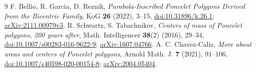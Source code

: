 \documentclass[11pt]{article}
\begin{document}
\begin{thebibliography}{9}
 F. Bellio, R. Garcia, D. Reznik,
\emph{Parabola-Inscribed Poncelet Polygons Derived from the Bicentric Family},
KoG \textbf{26} (2022), 3--15,
\href{https://doi.org/10.31896/k.26.1}{doi:10.31896/k.26.1};
\href{https://arxiv.org/abs/2111.00979}{arXiv:2111.00979v3}.
 R. Schwartz, S. Tabachnikov,
\emph{Centers of mass of Poncelet polygons, 200 years after},
Math. Intelligencer \textbf{38}(2) (2016), 29--34,
\href{https://doi.org/10.1007/s00283-016-9622-9}{doi:10.1007/s00283-016-9622-9};
\href{https://arxiv.org/abs/1607.04766}{arXiv:1607.04766}.
 A. C. Chavez-Caliz,
\emph{More about areas and centers of Poncelet polygons},
Arnold Math. J. \textbf{7} (2021), 91--106,
\href{https://doi.org/10.1007/s40598-020-00154-8}{doi:10.1007/s40598-020-00154-8};
\href{https://arxiv.org/abs/2004.05404}{arXiv:2004.05404}.
\end{thebibliography}
\end{document}
